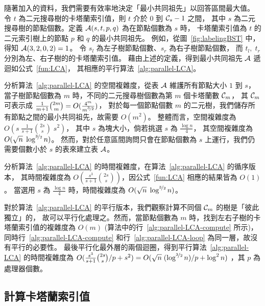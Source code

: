 隨著加入的資料，我們需要有效率地決定「最小共同祖先」以回答區間最大值。
令 $t$ 為二元搜尋樹的卡塔蘭索引值，則 $t$ 介於 $0$ 到 ${\cal C}_s-1$ 之間，
其中 $s$ 為二元搜尋樹的節點個數。定義 ${\cal A}(s, t, p, q)$ 為在節點個數為 $s$ 時，
卡塔蘭索引值為 $t$ 的二元索引樹上的節點 $p$ 和 $q$ 的最小共同祖先。
例如，從圖~\ref{fig:labelingBST} 中，得知 ${\cal A}(3, 2, 0, 2) = 1$。
令 $s_l$ 為左子樹節點個數、$s_r$ 為右子樹節點個數，
而 $t_l, \; t_r$ 分別為左、右子樹的的卡塔蘭索引值。
藉由上述的定義，得到最小共同祖先 ${\cal A}$ 遞迴如公式~\ref{fun:LCA}，
其相應的平行算法~\ref{alg:parallel-LCA}。





分析算法~\ref{alg:parallel-LCA} 的空間複雜度，從表 ${\cal A}$ 維護所有節點大小 $1$ 到 $s$，
當子樹節點個數為 $m$ 時，不同的二元搜尋樹個數為第 $m$ 個卡塔蘭數 ${\cal C}_m$，
其 ${\cal C}_m$ 可表示成 $\frac{1}{m+1}\binom{2m}{m}=O(\frac{4^m}{m^{\nicefrac{3}{2}}})$，
對於每一個節點個數 $m$ 的二元樹，我們儲存所有節點之間的最小共同祖先，故需要 $O(m^2)$。
整體而言，空間複雜度為 $O(s \; \frac{1}{s+1}\binom{2s}{s} \; s^2)$，
其中 $s$ 為塊大小，倘若挑選 $s$ 為 $\frac{\log n}{4}$，
其空間複雜度為 $O(\sqrt{n} \; \log^{\nicefrac{3}{2}} n)$。
然而，對於任意區間詢問只會在節點個數為 $s$ 上運行，我們仍需要個數小於 $s$ 的表來建立表 ${\cal A}$。

分析算法~\ref{alg:parallel-LCA} 的時間複雜度，在算法~\ref{alg:parallel-LCA} 的循序版本，
其時間複雜度為 $O(\frac{s^3}{s+1} \binom{2s}{s})$，因公式~\ref{fun:LCA} 相應的結果皆為 $O(1)$。
當選用 $s$ 為 $\frac{\log n}{4}$ 時，時間複雜度為 $O(\sqrt{n} \; \log^{\nicefrac{3}{2}} n)$。

對於算法~\ref{alg:parallel-LCA} 的平行版本，我們觀察計算不同個 ${\cal C}_m$ 的樹是「彼此獨立」的，
故可以平行化處理之。然而，當節點個數為 $m$ 時，找到左右子樹的卡塔蘭索引值的複雜度為 $O(m)$ 
(算法中的行~\ref{alg:parallel-LCA-compute} 所示)，
同時行~\ref{alg:parallel-LCA-compute} 和行~\ref{alg:parallel-LCA-loop} 為同一層，故沒有平行的必要性。
最後平行化最外層的兩個迴圈，得到平行算法~\ref{alg:parallel-LCA} 的時間複雜度為
$O(\frac{s^3}{s+1} \binom{2s}{s} / p + s^2) = O(\sqrt{n} \; (\log^{\nicefrac{3}{2}} n) / p + \log^2 n)$
，其 $p$ 為處理器個數。

\subsection{計算卡塔蘭索引值}

